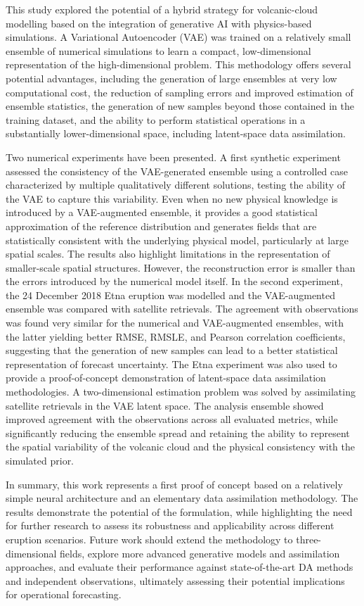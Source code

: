 \conclusions \label{sec:conclusions}
%
%
This study explored the potential of a hybrid strategy for volcanic-cloud modelling based on the integration of generative AI with physics-based simulations. A Variational Autoencoder (VAE) was trained on a relatively small ensemble of numerical simulations to learn a compact, low-dimensional representation of the high-dimensional problem. This methodology offers several potential advantages, including the generation of large ensembles at very low computational cost, the reduction of sampling errors and improved estimation of ensemble statistics, the generation of new samples beyond those contained in the training dataset, and the ability to perform statistical operations in a substantially lower-dimensional space, including latent-space data assimilation.

%
%
Two numerical experiments have been presented. A first synthetic experiment assessed the consistency of the VAE-generated ensemble using a controlled case characterized by multiple qualitatively different solutions, testing the ability of the VAE to capture this variability. Even when no new physical knowledge is introduced by a VAE-augmented ensemble, it provides a good statistical approximation of the reference distribution and generates fields that are statistically consistent with the underlying physical model, particularly at large spatial scales. The results also highlight limitations in the representation of smaller-scale spatial structures.
%
However, the reconstruction error is smaller than the errors introduced by the numerical model itself. In the second  experiment, the 24 December 2018 Etna eruption was modelled and the VAE-augmented ensemble was compared with satellite retrievals. The agreement with observations was found very similar for the numerical and VAE-augmented ensembles, with the latter yielding better RMSE, RMSLE, and Pearson correlation coefficients, suggesting that the generation of new samples can lead to a better statistical representation of forecast uncertainty.
%
The Etna experiment was also used to provide a proof-of-concept demonstration of latent-space data assimilation methodologies. A two-dimensional estimation problem was solved by assimilating satellite retrievals in the VAE latent space. The analysis ensemble showed improved agreement with the observations across all evaluated metrics, while significantly reducing the ensemble spread and retaining the ability to represent the spatial variability of the volcanic cloud and the physical consistency with the simulated prior. 

%
%
In summary, this work represents a first proof of concept based on a relatively simple neural architecture and an elementary data assimilation methodology. The results demonstrate the potential of the formulation, while highlighting the need for further research to assess its robustness and applicability across different eruption scenarios. Future work should extend the methodology to three-dimensional fields, explore more advanced generative models and assimilation approaches, and evaluate their performance against state-of-the-art DA methods and independent observations, ultimately assessing their potential implications for operational forecasting.